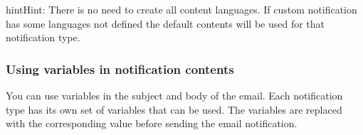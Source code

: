 \documentclass[letterpaper,10pt,english]{sphinxmanual}
\begin{document}
\begin{notice}{hint}{Hint:}
There is no need to create all content languages. If custom notification has some languages not defined the
default contents will be used for that notification type.
\end{notice}


\subsubsection{Using variables in notification contents}
\label{administration_portal/brand/settings/notification_templates:using-variables-in-notification-contents}
You can use variables in the subject and body of the email. Each notification type has its own set of variables
that can be used. The variables are replaced with the corresponding value before sending the email notification.
\end{document}
